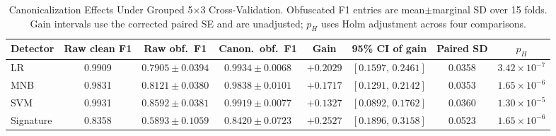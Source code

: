 
\begin{table}[t]
\caption{Canonicalization Effects Under Grouped 5$\times$3 Cross-Validation.
  Obfuscated F1 entries are mean$\pm$marginal SD over 15 folds.
  Gain intervals use the corrected paired SE and are unadjusted;
  $p_H$ uses Holm adjustment across four comparisons.}
\label{tab:canon}
\begin{center}
\setlength{\tabcolsep}{4pt}\footnotesize
\begin{tabular}{|l|c|c|c|c|c|c|c|}
\hline
\textbf{Detector} &
\textbf{Raw clean F1} &
\textbf{Raw obf.\ F1} &
\textbf{Canon.\ obf.\ F1} &
\textbf{Gain} &
\textbf{95\% CI of gain} &
\textbf{Paired SD} &
\textbf{$p_H$} \\
\hline
LR      & 0.9909 & $0.7905\pm0.0394$ & $0.9934\pm0.0068$ & $+0.2029$ & $[0.1597,\,0.2461]$ & 0.0358 & $3.42\times10^{-7}$ \\
\hline
MNB     & 0.9831 & $0.8121\pm0.0380$ & $0.9838\pm0.0101$ & $+0.1717$ & $[0.1291,\,0.2142]$ & 0.0353 & $1.65\times10^{-6}$ \\
\hline
SVM     & 0.9931 & $0.8592\pm0.0381$ & $0.9919\pm0.0077$ & $+0.1327$ & $[0.0892,\,0.1762]$ & 0.0360 & $1.30\times10^{-5}$ \\
\hline
Signature & 0.8358 & $0.5893\pm0.1059$ & $0.8420\pm0.0723$ & $+0.2527$ & $[0.1896,\,0.3158]$ & 0.0523 & $1.65\times10^{-6}$ \\
\hline
\end{tabular}
\end{center}
\end{table}

